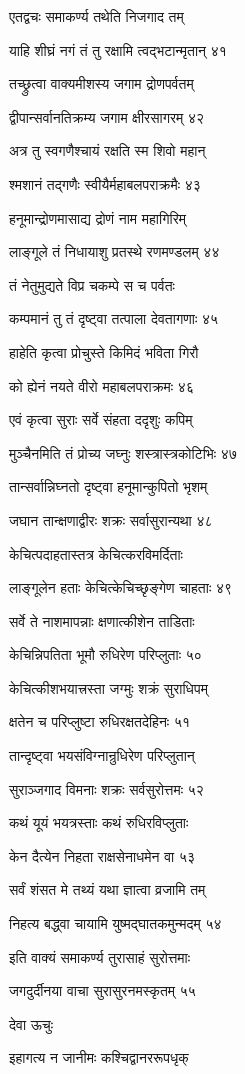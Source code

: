 एतद्वचः समाकर्ण्य तथेति निजगाद तम्

याहि शीघ्रं नगं तं तु रक्षामि त्वद्भटान्मृतान् ४१

तच्छ्रुत्वा वाक्यमीशस्य जगाम द्रोणपर्वतम्

द्वीपान्सर्वानतिक्रम्य जगाम क्षीरसागरम् ४२

अत्र तु स्वगणैश्चायं रक्षति स्म शिवो महान्

श्मशानं तद्गणैः स्वीयैर्महाबलपराक्रमैः ४३

हनूमान्द्रोणमासाद्य द्रोणं नाम महागिरिम्

लाङ्गूले तं निधायाशु प्रतस्थे रणमण्डलम् ४४

तं नेतुमुद्यते विप्र चकम्पे स च पर्वतः

कम्पमानं तु तं दृष्ट्वा तत्पाला देवतागणाः ४५

हाहेति कृत्वा प्रोचुस्ते किमिदं भविता गिरौ

को ह्येनं नयते वीरो महाबलपराक्रमः ४६

एवं कृत्वा सुराः सर्वे संहता ददृशुः कपिम्

मुञ्चैनमिति तं प्रोच्य जघ्नुः शस्त्रास्त्रकोटिभिः ४७

तान्सर्वान्निघ्नतो दृष्ट्वा हनूमान्कुपितो भृशम्

जघान तान्क्षणाद्वीरः शक्रः सर्वासुरान्यथा ४८

केचित्पदाहतास्तत्र केचित्करविमर्दिताः

लाङ्गूलेन हताः केचित्केचिच्छृङ्गेण चाहताः ४९

सर्वे ते नाशमापन्नाः क्षणात्कीशेन ताडिताः

केचिन्निपतिता भूमौ रुधिरेण परिप्लुताः ५०

केचित्कीशभयात्त्रस्ता जग्मुः शक्रं सुराधिपम्

क्षतेन च परिप्लुष्टा रुधिरक्षतदेहिनः ५१

तान्दृष्ट्वा भयसंविग्नान्रुधिरेण परिप्लुतान्

सुराञ्जगाद विमनाः शक्रः सर्वसुरोत्तमः ५२

कथं यूयं भयत्रस्ताः कथं रुधिरविप्लुताः

केन दैत्येन निहता राक्षसेनाधमेन वा ५३

सर्वं शंसत मे तथ्यं यथा ज्ञात्वा व्रजामि तम्

निहत्य बद्ध्वा चायामि युष्मद्घातकमुन्मदम् ५४

इति वाक्यं समाकर्ण्य तुरासाहं सुरोत्तमाः

जगदुर्दीनया वाचा सुरासुरनमस्कृतम् ५५

देवा ऊचुः

इहागत्य न जानीमः कश्चिद्वानररूपधृक्

